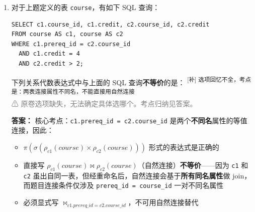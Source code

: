 \documentclass[11pt,a4paper]{article}
\newcommand{\solution}{\par\noindent\textcolor{ansblue}{\textbf{解：}}}
\newcommand{\answer}{\par\noindent\textcolor{ansred}{\textbf{答案：}}}
\newcommand{\supp}[1]{\textcolor{ansred}{\textsuperscript{[补] #1}}}
\begin{document}
\begin{enumerate}[leftmargin=*,itemsep=8pt]
最后一条语句返回的结果是：

\begin{enumerate}[label=\Alph*.]
  \item 1
  \item 2
  \item 3
  \item 4
\end{enumerate}

\solution
逐步追踪（注意 CASCADE 约束）：

\textbf{初始}：
11(2,NULL), 22(4,NULL), 33(3,NULL), 44(3,22), 55(4,22), 66(3,33)。

\textbf{(1) INSERT ('77',4,'11')}：
新增 77(4,11)。

\textbf{(2) DELETE course\_id='11'}：
删除 11。CASCADE：所有 prereq\_id=11 的记录也被删除 $\to$ 77 被删。

剩余：22(4,NULL), 33(3,NULL), 44(3,22), 55(4,22), 66(3,33)。

\textbf{(3) UPDATE course\_id='11', credit=2 WHERE course\_id='33'}：
33 改为 11(credit=2)。CASCADE：66 的 prereq\_id 跟着从 33 变为 11。

剩余：11(2,NULL)\textsuperscript{原33}, 22(4,NULL), 44(3,22), 55(4,22), 66(3,11)。

\textbf{(4) SELECT COUNT(*) WHERE credit > 2}：
credit>2 的记录：22(4), 44(3), 55(4), 66(3)，共 4 条。
11 的 credit=2 不满足。

\answer D. 4。注意 CASCADE 的连锁效应是关键。

\item 对于上题定义的表 \texttt{course}，有如下 SQL 查询：
\begin{verbatim}
SELECT c1.course_id, c1.credit, c2.course_id, c2.credit
FROM course AS c1, course AS c2
WHERE c1.prereq_id = c2.course_id
  AND c1.credit = 4
  AND c2.credit > 2;
\end{verbatim}

下列关系代数表达式中与上面的 SQL 查询\textbf{不等价}的是：
\supp{选项回忆不全，考点是：两表连接属性不同名，不能直接用自然连接}
\\[2pt]
\textcolor{gray}{⚠ 原卷选项缺失，无法确定具体选哪个。考点归纳见答案。}

\answer
核心考点：\texttt{c1.prereq\_id = c2.course\_id} 是两个\textbf{不同名}属性的等值连接，因此：
\begin{itemize}[nosep]
  \item $\pi(\sigma(\rho_{c1}(course)\times\rho_{c2}(course)))$ 形式的表达式是正确的
  \item 直接写 $\rho_{c1}(course) \Join \rho_{c2}(course)$（自然连接）\textbf{不等价}——因为 \texttt{c1} 和 \texttt{c2} 虽出自同一表，但经重命名后，自然连接会基于\textbf{所有同名属性}做 join，而题目连接条件仅涉及 \texttt{prereq\_id = course\_id} 一对不同名属性
  \item 必须显式写 $\Join_{c1.prereq\_id = c2.course\_id}$，不可用自然连接替代
\end{itemize}


\end{enumerate}
\end{document}
